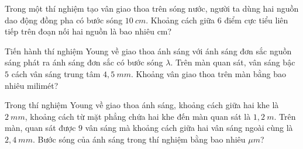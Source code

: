 \begin{ex}
	Trong một thí nghiệm tạo vân giao thoa trên sóng nước, người ta dùng hai nguồn dao động đồng pha có bước sóng $10 \ cm$. Khoảng cách giữa $6$ điểm cực tiểu liên tiếp trên đoạn nối hai nguồn là bao nhiêu cm?
\end{ex}
\begin{ex}
	Tiến hành thí nghiệm Young về giao thoa ánh sáng với ánh sáng đơn sắc nguồn sáng phát ra ánh sáng đơn sắc có bước sóng $\lambda$. Trên màn quan sát, vân sáng bậc $5$ cách vân sáng trung tâm $4,5\ mm$. Khoảng vân giao thoa trên màn bằng bao nhiêu milimét?
\end{ex}
\begin{ex}
	Trong thí nghiệm Young về giao thoa ánh sáng, khoảng cách giữa hai khe là $2 \ mm$, khoảng cách từ mặt phẳng chứa hai khe đến màn quan sát là $1,2 \ m$. Trên màn, quan sát được $9$ vân sáng mà khoảng cách giữa hai vân sáng ngoài cùng là $2,4 \ mm$. Bước sóng của ánh sáng trong thí nghiệm bằng bao nhiêu $\mu m$?
\end{ex}